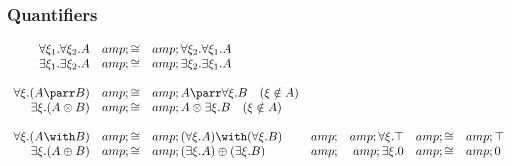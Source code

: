\subsubsection{Quantifiers}\label{quantifiers-1}

\(\begin{array}{rclcrcl}
  \forall \xi_1. \forall\xi_2. A &amp;\cong&amp; \forall\xi_2. \forall\xi_1. A\\
  \exists \xi_1. \exists\xi_2.A &amp;\cong&amp; \exists\xi_2.\exists\xi_1.A\\
\\
  \forall \xi . (A \parr B) &amp;\cong&amp; A \parr \forall \xi.B \quad (\xi\notin A) \\
  \exists \xi . (A \tens B) &amp;\cong&amp; A \tens \exists \xi.B \quad (\xi\notin A) \\
\\
  \forall \xi . (A \with B) &amp;\cong&amp; (\forall \xi . A) \with (\forall \xi . B) &amp; &amp; \forall \xi . \top &amp;\cong&amp; \top \\
  \exists \xi . (A \plus B) &amp;\cong&amp; (\exists \xi . A) \plus (\exists \xi . B) &amp; &amp; \exists \xi . \zero &amp;\cong&amp; \zero
\end{array}\)


